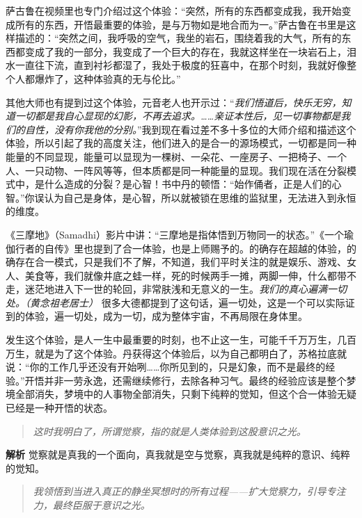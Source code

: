 萨古鲁在视频里也专门介绍过这个体验：“突然，所有的东西都变成我，我开始变成所有的东西，开悟最重要的体验，是与万物如是地合而为一。”萨古鲁在书里是这样描述的：“突然之间，我呼吸的空气，我坐的岩石，围绕着我的大气，所有的东西都变成了我的一部分，我变成了一个巨大的存在，我就这样坐在一块岩石上，泪水一直往下流，直到衬衫都湿了，我处于极度的狂喜中，在那个时刻，我就好像整个人都爆炸了，这种体验真的无与伦比。”

其他大师也有提到过这个体验，元音老人也开示过：“\textit{我们悟道后，快乐无穷，知道一切都是我自心显现的幻影，不再去追求。……亲证本性后，见一切事物都是我们的自性，没有你我他的分别。}”我到现在看过差不多十多位的大师介绍和描述这个体验，所以引起了我的高度关注，他们进入的是合一的源场模式，一切都是同一种能量的不同显现，能量可以显现为一棵树、一朵花、一座房子、一把椅子、一个人、一只动物、一阵风等等，但本质都是同一种能量的显现。我们现在活在分裂模式中，是什么造成的分裂？是心智！书中丹的顿悟：“始作俑者，正是人们的心智。”你误认为自己是身体，是心智，所以就被锁在思维的监狱里，无法进入到永恒的维度。

《三摩地》（Samadhi）影片中讲：“三摩地是指体悟到万物同一的状态。”《一个瑜伽行者的自传》里也提到了合一体验，也是上师赐予的。的确存在超越的体验，的确存在合一模式，只是我们不了解，不知道，我们平时关注的就是娱乐、游戏、女人、美食等，我们就像井底之蛙一样，死的时候两手一摊，两脚一伸，什么都带不走，迷茫地进入下一世的轮回，非常肤浅和无意义的一生。\textit{我们的真心遍满一切处。（黄念祖老居士）} 很多大德都提到了这句话，遍一切处，这是一个可以实际证到的体验，遍一切处，成为一切，成为整体宇宙，不再局限在身体里。

发生这个体验，是人一生中最重要的时刻，也不止这一生，可能千千万万生，几百万生，就是为了这个体验。丹获得这个体验后，以为自己都明白了，苏格拉底就说：“你的工作几乎还没有开始咧……你所见到的，只是幻象，而不是最终的经验。”开悟并非一劳永逸，还需继续修行，去除各种习气。最终的经验应该是整个梦境全部消失，梦境中的人事物全部消失，只剩下纯粹的觉知，但这个合一体验无疑已经是一种开悟的状态。

\begin{quote}\it
    这时我明白了，所谓觉察，指的就是人类体验到这股意识之光。
\end{quote}

\textbf{解析} 觉察就是真我的一个面向，真我就是空与觉察，真我就是纯粹的意识、纯粹的觉知。

\begin{quote}\it
    我领悟到当进入真正的静坐冥想时的所有过程——扩大觉察力，引导专注力，最终臣服于意识之光。
\end{quote}

